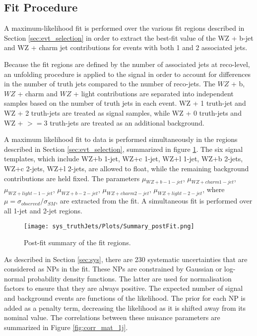 
\subsection{Fit Procedure}
\label{sec:fit}

A maximum-likelihood fit is performed over the various fit regions described in Section \ref{sec:evt_selection} in order to extract the best-fit value of the WZ + b-jet and WZ + charm jet contributions for events with both 1 and 2 associated jets.

Because the fit regions are defined by the number of associated jets at reco-level, an unfolding procedure is applied to the signal in order to account for differences in the number of truth jets compared to the number of reco-jets. The $WZ$ + b, $WZ$ + charm and $WZ$ + light contributions are separated into independent samples based on the number of truth jets in each event. WZ + 1 truth-jet and WZ + 2 truth-jets are treated as signal samples, while WZ + 0 truth-jets and WZ + $>=$3 truth-jets are treated as an additional background. 

A maximum likelihood fit to data is performed simultaneously in the regions described in Section \ref{sec:evt_selection}, summarized in figure \ref{fig:summary}. The six signal templates, which include WZ+b 1-jet, WZ+c 1-jet, WZ+l 1-jet, WZ+b 2-jets, WZ+c 2-jets, WZ+l 2-jets, are allowed to float, while the remaining background contributions are held fixed. The parameters $\mu_{WZ+b - 1-jet}$, $\mu_{WZ+charm 1-jet}$, $\mu_{WZ+light - 1-jet}$, $\mu_{WZ+b - 2-jet}$, $\mu_{WZ+charm 2-jet}$, $\mu_{WZ+light - 2-jet}$, where $\mu = \sigma_{observed}/\sigma_{SM} $, are extracted from the fit. A simultaneous fit is performed over all 1-jet and 2-jet regions.

\begin{figure}[H]
  \center                                                                                                                    
  \texttt{[image: sys\_truthJets/Plots/Summary\_postFit.png]}
  \caption{Post-fit summary of the fit regions.}
  \label{fig:summary}
\end{figure}

As described in Section \ref{sec:sys}, there are 230 systematic uncertainties that are considered as NPs in the fit. These NPs are constrained by Gaussian or log-normal probability density functions. The latter are used for normalisation factors to ensure that they are always positive. The expected number of signal and background events are functions of the likelihood. The prior for each NP is added as a penalty term, decreasing the likelihood as it is shifted away from its nominal value. The correlations between these nuisance parameters are summarized in Figure \ref{fig:corr_mat_1j}. 

